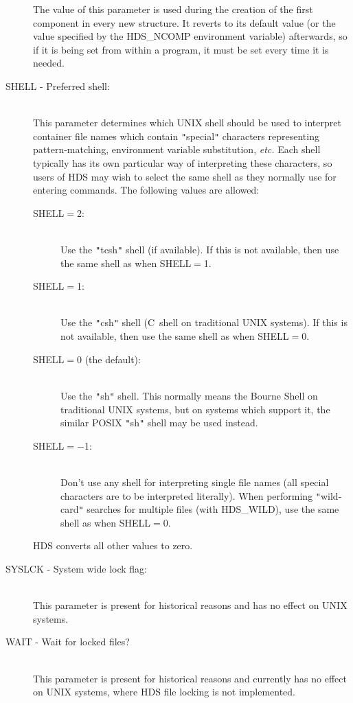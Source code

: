 \documentclass[11pt]{article}
\newcommand{\htmlref}[2]{#1}
\newcommand{\xlabel}[1]{}
\newcommand{\qt}[1]{``#1''}
\newcommand{\st}[1]{{\em{#1}}}
\renewcommand{\qt}[1]{{\tt{"}}#1{\tt{"}}}
\begin{document}
\begin{description}
The value of this parameter is used during the creation of the first
component in every new structure.  It reverts to its default value (or
the value specified by the HDS\_NCOMP environment variable)
afterwards, so if it is being set from within a program, it must be
set every time it is needed.

\item [\xlabel{HDS_SHELL_tuning_parameter}SHELL - Preferred shell:]\mbox{}\\
This parameter determines which UNIX shell should be used to interpret
container file names which contain \qt{special} characters
representing pattern-matching, environment variable substitution,
\st{etc.} Each shell typically has its own particular way of
interpreting these characters, so users of HDS may wish to select the
same shell as they normally use for entering commands. The following
values are allowed:

\begin{description}

\item[SHELL$=$2:]\mbox{}\\
Use the \qt{tcsh} shell (if available). If this is not available, then
use the same shell as when SHELL$=$1.

\item[SHELL$=$1:]\mbox{}\\
Use the \qt{csh} shell (C~shell on traditional UNIX systems). If this
is not available, then use the same shell as when SHELL$=$0.

\item[SHELL$=$0 (the default):]\mbox{}\\
Use the \qt{sh} shell. This normally means the Bourne Shell on
traditional UNIX systems, but on systems which support it, the similar
POSIX \qt{sh} shell may be used instead.

\item[SHELL$=-$1:]\mbox{}\\
Don't use any shell for interpreting single file names (all special
characters are to be interpreted literally). When performing
\qt{wild-card} searches for multiple files (with
\htmlref{HDS\_WILD}{HDS_WILD}), use the same shell as when SHELL$=$0.

\end{description}

HDS converts all other values to zero.

\item [\xlabel{HDS_SYSLCK_tuning_parameter}SYSLCK - System wide lock flag:]\mbox{}\\
This parameter is present for historical reasons and has no effect on
UNIX systems.

\item [\xlabel{HDS_WAIT_tuning_parameter}WAIT - Wait for locked files?]\mbox{}\\
This parameter is present for historical reasons and currently has no
effect on UNIX systems, where HDS file locking is not implemented.

\end{description}
\end{document}
